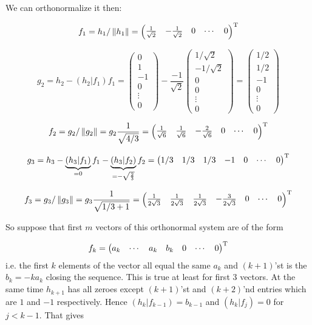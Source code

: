 \documentclass{article}
\begin{document}
            We can orthonormalize it then:

\[f_1 = h_1 / \left\|{h_1}\right\| =
\begin{pmatrix}\frac{1}{\sqrt2} & - \frac{1}{\sqrt2} & 0 & \cdots & 0 \end{pmatrix}^{\mathrm{T}}\]

    \[g_2 = h_2 - \left(h_2|f_1\right)f_1 =
\begin{pmatrix}0\\ 1\\ -1 \\ 0 \\ \vdots \\ 0 \end{pmatrix}
    -
\frac{-1}{\sqrt2} \begin{pmatrix} 1/\sqrt2 \\ - 1/\sqrt2 \\ 0 \\ 0 \\ \vdots \\ 0 \end{pmatrix}
    = \begin{pmatrix} 1/2 \\ 1/2 \\ -1 \\ 0 \\ \vdots \\ 0 \end{pmatrix}\]

        \[f_2 = g_2/\left\|{g_2}\right\| =
g_2 \frac{1}{\sqrt{4/3}} =
\begin{pmatrix} \frac1{\sqrt6} & \frac1{\sqrt6} & - \frac2{\sqrt6} & 0 & \cdots & 0 \end{pmatrix}^{\mathrm{T}}\]

    \[g_3 =
h_3 - \underbrace{\left(h_3|f_1\right)}_{=0}f_1
    - \underbrace{\left(h_3|f_2\right)}_{=-\sqrt{\frac23}}f_2
= \begin{pmatrix} 1/3 & 1/3 & 1/3 & -1 & 0 & \cdots & 0 \end{pmatrix}^{\mathrm{T}}\]

    \[f_3 = g_3 / \left\|{g_3}\right\| = g_3 \frac{1}{\sqrt{1/3 + 1}} =
\begin{pmatrix}
    \frac{1}{2\sqrt3} & \frac{1}{2\sqrt3} &
    \frac{1}{2\sqrt3} & - \frac{3}{2\sqrt3} &
    0 & \cdots & 0
\end{pmatrix}^{\mathrm{T}}\]

So suppose that first \( m \) vectors of this orthonormal system
are of the form

\[ f_k =
\begin{pmatrix}
    a_k & \cdots & a_k & b_k & 0 & \cdots & 0
\end{pmatrix}^{\mathrm{T}}\]
i.e. the first \( k \) elements of the vector all equal the same \( a_k \)
and \( (k+1) \)'st is the \( b_k = -ka_k \) closing the sequence.
This is true at least for first 3 vectors.
At the same time \( h_{k+1} \) has all zeroes
except \( (k+1) \)'st and \( (k+2) \)'nd entries which are \( 1 \) and \( -1 \) respectively.
Hence \( \left(h_k|f_{k-1}\right) = b_{k-1} \) and \( \left(h_k|f_j\right) = 0 \) for \( j < k-1 \).
That gives
\end{document}
